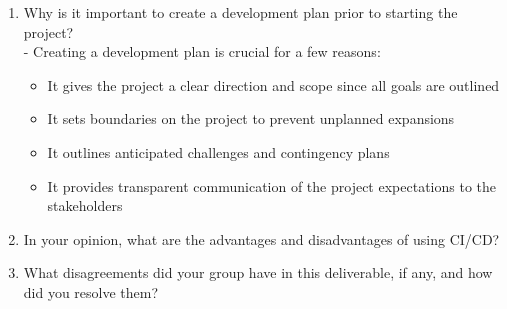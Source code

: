 \documentclass{article}
\begin{document}
\begin{enumerate}
    \item Why is it important to create a development plan prior to starting the
    project?\\
    - Creating a development plan is crucial for a few reasons:
    \begin{itemize}
      \item It gives the project a clear direction and scope since all goals are outlined
      \item It sets boundaries on the project to prevent unplanned expansions
      \item It outlines anticipated challenges and contingency plans
      \item It provides transparent communication of the project expectations to the stakeholders
    \end{itemize}
    \item In your opinion, what are the advantages and disadvantages of using
    CI/CD?
    \item What disagreements did your group have in this deliverable, if any,
    and how did you resolve them?
\end{enumerate}
\end{document}
